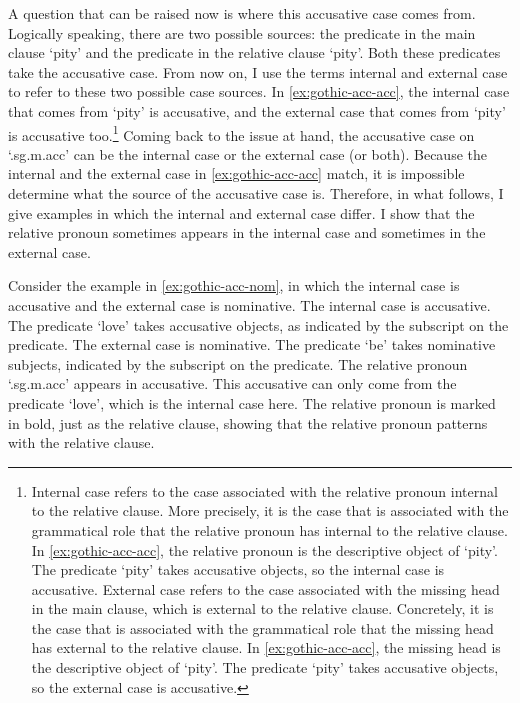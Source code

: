 A question that can be raised now is where this accusative case comes from. Logically speaking, there are two possible sources: the predicate in the main clause  `pity' and the predicate in the relative clause  `pity'. Both these predicates take the accusative case. From now on, I use the terms internal and external case to refer to these two possible case sources. In \ref{ex:gothic-acc-acc}, the internal case that comes from  `pity' is accusative, and the external case that comes from  `pity' is accusative too.\footnote{
Internal case refers to the case associated with the relative pronoun internal to the relative clause. More precisely, it is the case that is associated with the grammatical role that the relative pronoun has internal to the relative clause. In \ref{ex:gothic-acc-acc}, the relative pronoun is the descriptive object of  `pity'. The predicate  `pity' takes accusative objects, so the internal case is accusative.
External case refers to the case associated with the missing head in the main clause, which is external to the relative clause. Concretely, it is the case that is associated with the grammatical role that the missing head has external to the relative clause. In \ref{ex:gothic-acc-acc}, the missing head is the descriptive object of  `pity'. The predicate  `pity' takes accusative objects, so the external case is accusative.
}
Coming back to the issue at hand, the accusative case on  `.\ac{sg}.\ac{m}.\ac{acc}' can be the internal case or the external case (or both).
Because the internal and the external case in \ref{ex:gothic-acc-acc} match, it is impossible determine what the source of the accusative case is.
Therefore, in what follows, I give examples in which the internal and external case differ.
I show that the relative pronoun sometimes appears in the internal case and sometimes in the external case.

Consider the example in \ref{ex:gothic-acc-nom}, in which the internal case is accusative and the external case is nominative.
The internal case is accusative. The predicate  `love' takes accusative objects, as indicated by the subscript on the predicate.
The external case is nominative. The predicate  `be' takes nominative subjects, indicated by the subscript on the predicate.
The relative pronoun  `.\ac{sg}.\ac{m}.\ac{acc}' appears in accusative. This accusative can only come from the predicate  `love', which is the internal case here. The relative pronoun is marked in bold, just as the relative clause, showing that the relative pronoun patterns with the relative clause.

